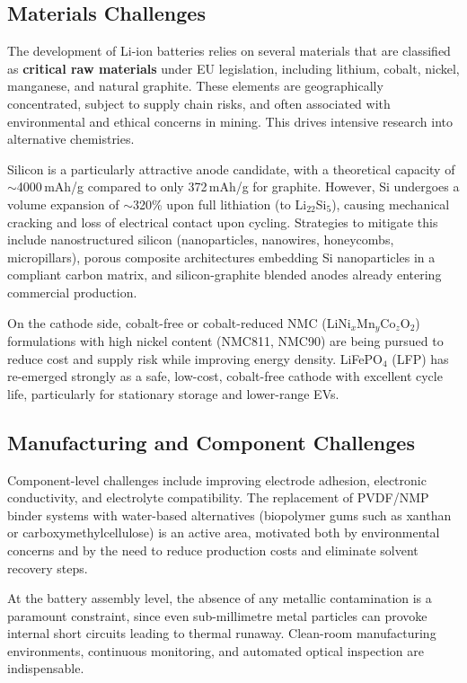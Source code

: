 \subsection{Materials Challenges}

The development of Li-ion batteries relies on several materials that are classified as \textbf{critical raw materials} under EU legislation, including lithium, cobalt, nickel, manganese, and natural graphite. These elements are geographically concentrated, subject to supply chain risks, and often associated with environmental and ethical concerns in mining. This drives intensive research into alternative chemistries.

Silicon is a particularly attractive anode candidate, with a theoretical capacity of $\sim$4000\,mAh/g compared to only 372\,mAh/g for graphite. However, Si undergoes a volume expansion of $\sim$320\% upon full lithiation (to Li$_{22}$Si$_5$), causing mechanical cracking and loss of electrical contact upon cycling. Strategies to mitigate this include nanostructured silicon (nanoparticles, nanowires, honeycombs, micropillars), porous composite architectures embedding Si nanoparticles in a compliant carbon matrix, and silicon-graphite blended anodes already entering commercial production.

On the cathode side, cobalt-free or cobalt-reduced NMC (LiNi$_x$Mn$_y$Co$_z$O$_2$) formulations with high nickel content (NMC811, NMC90) are being pursued to reduce cost and supply risk while improving energy density. LiFePO$_4$ (LFP) has re-emerged strongly as a safe, low-cost, cobalt-free cathode with excellent cycle life, particularly for stationary storage and lower-range EVs.

\subsection{Manufacturing and Component Challenges}

Component-level challenges include improving electrode adhesion, electronic conductivity, and electrolyte compatibility. The replacement of PVDF/NMP binder systems with water-based alternatives (biopolymer gums such as xanthan or carboxymethylcellulose) is an active area, motivated both by environmental concerns and by the need to reduce production costs and eliminate solvent recovery steps.

At the battery assembly level, the absence of any metallic contamination is a paramount constraint, since even sub-millimetre metal particles can provoke internal short circuits leading to thermal runaway. Clean-room manufacturing environments, continuous monitoring, and automated optical inspection are indispensable.

